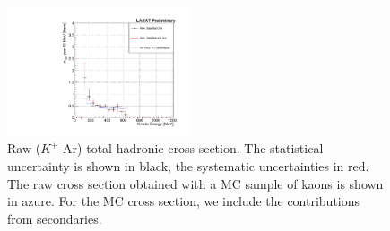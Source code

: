 \begin{figure}
\centering  
\includegraphics[width=0.48\textwidth]{Chapter-7/Images/Plots_MCData_XS_StatSystK.pdf}
\caption{Raw ($K^+$-Ar) total hadronic cross section. The statistical uncertainty is shown in black, the systematic uncertainties in red. The raw cross section obtained with a MC sample of kaons is shown in azure. For the MC cross section,  we include the contributions from secondaries. }
\label{fig:XSRaw}
\end{figure}





